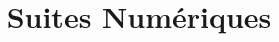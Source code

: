 \documentclass[11pt]{article}%
\title{	
  \vspace{-10ex}
  \horrule{0.5pt} \\[0.4cm] %
  \huge Suites Numériques\\ %
  \horrule{2pt} \\[0.5cm] %
}
\author{}
\date{\vspace{-10ex}} %
\begin{document}

\newtheorem{Definition}{Définition}
\newtheorem{Theorem}{Théorème}
\newtheorem{Proposition}{Propriété}

\renewcommand{\labelitemi}{$\bullet$}
\renewcommand{\labelitemii}{$\circ$}

\maketitle %
\setlength{\columnseprule}{1pt}
\end{document}
